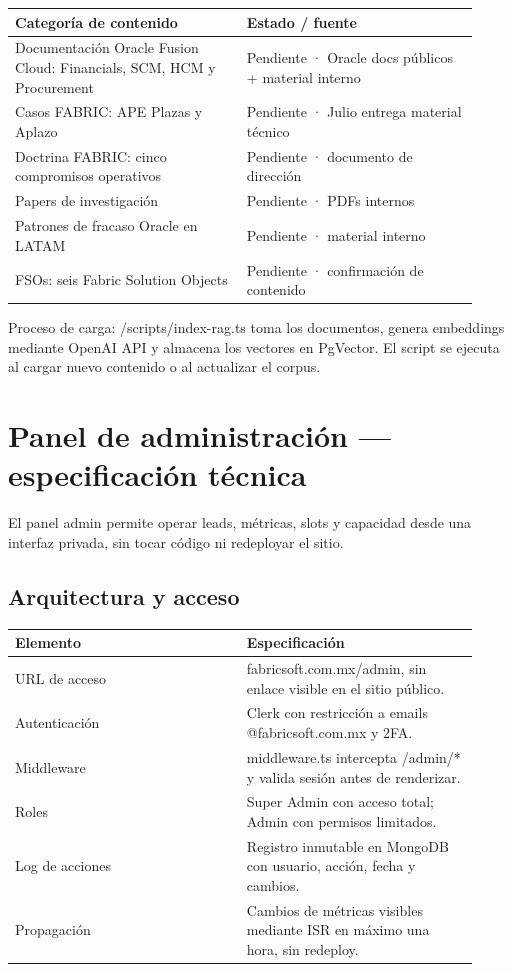 \documentclass[11pt,letterpaper]{article}
\begin{document}
\begin{longtable}{p{0.46\linewidth}p{0.46\linewidth}}
\toprule
\textbf{Categoría de contenido} & \textbf{Estado / fuente} \\
\midrule
Documentación Oracle Fusion Cloud: Financials, SCM, HCM y Procurement & Pendiente · Oracle docs públicos + material interno \\
Casos FABRIC: APE Plazas y Aplazo & Pendiente · Julio entrega material técnico \\
Doctrina FABRIC: cinco compromisos operativos & Pendiente · documento de dirección \\
Papers de investigación & Pendiente · PDFs internos \\
Patrones de fracaso Oracle en LATAM & Pendiente · material interno \\
FSOs: seis Fabric Solution Objects & Pendiente · confirmación de contenido \\
\bottomrule
\end{longtable}

Proceso de carga: /scripts/index-rag.ts toma los documentos, genera embeddings mediante OpenAI API y almacena los vectores en PgVector. El script se ejecuta al cargar nuevo contenido o al actualizar el corpus.

\section{Panel de administración — especificación técnica}

El panel admin permite operar leads, métricas, slots y capacidad desde una interfaz privada, sin tocar código ni redeployar el sitio.

\subsection{Arquitectura y acceso}

\begin{longtable}{p{0.46\linewidth}p{0.46\linewidth}}
\toprule
\textbf{Elemento} & \textbf{Especificación} \\
\midrule
URL de acceso & fabricsoft.com.mx/admin, sin enlace visible en el sitio público. \\
Autenticación & Clerk con restricción a emails @fabricsoft.com.mx y 2FA. \\
Middleware & middleware.ts intercepta /admin/* y valida sesión antes de renderizar. \\
Roles & Super Admin con acceso total; Admin con permisos limitados. \\
Log de acciones & Registro inmutable en MongoDB con usuario, acción, fecha y cambios. \\
Propagación & Cambios de métricas visibles mediante ISR en máximo una hora, sin redeploy. \\
\bottomrule
\end{longtable}
\end{document}

